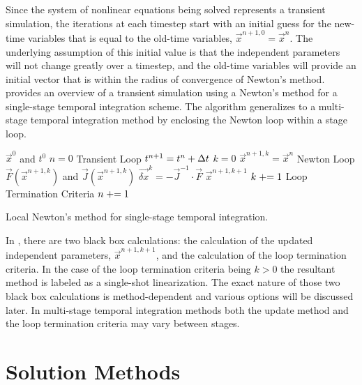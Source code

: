 Since the system of nonlinear equations being solved represents a transient simulation, the iterations at each timestep start with an initial guess for the new-time variables that is equal to the old-time variables, $\vec{x}^{n+1,0} = \vec{x}^{n}$.
The underlying assumption of this initial value is that the independent parameters will not change greatly over a timestep, and the old-time variables will provide an initial vector that is within the radius of convergence of Newton's method.
 provides an overview of a transient simulation using a Newton's method for a single-stage temporal integration scheme.
The algorithm generalizes to a multi-stage temporal integration method by enclosing the Newton loop within a stage loop.

\begin{algo}[ht!]
\setlength{\baselineskip}{0.625\baselineskip}
\begin{algorithmic}[1]
\Require $\vec{x}^{0}$ and $t^{0}$
\Set $n = 0$
\Loop \; Transient Loop
    \Set $t^{n+1} = t^{n} + \dt{}$
    \Set $k = 0$
    \Set $\vec{x}^{n+1,k} = \vec{x}^{n}$
    \Loop \; Newton Loop
		\Calculate $\vec{F}(\vec{x}^{n+1,k})$ and $\vec{J}(\vec{x}^{n+1,k})$
		\Calculate $\vec{\delta x}^k = - \vec{J}^{-1}\cdot\vec{F}$
		\BlackBox $\vec{x}^{n+1,k+1}$
		\Set $k \mathrel{+}= 1$
		\BlackBox Loop Termination Criteria
	\EndLoop
	\Set $n \mathrel{+}= 1$
\EndLoop
\end{algorithmic}
\caption{Local Newton's method for single-stage temporal integration.}
\label{alg:local_newton}
\end{algo}

In , there are two black box calculations: the calculation of the updated independent parameters, $\vec{x}^{n+1,k+1}$, and the calculation of the loop termination criteria.
In the case of the loop termination criteria being $k > 0$ the resultant method is labeled as a single-shot linearization.
The exact nature of those two black box calculations is method-dependent and various options will be discussed later.
In multi-stage temporal integration methods both the update method and the loop termination criteria may vary between stages. 

\section{Solution Methods}
\label{sect:solution_techniques}

